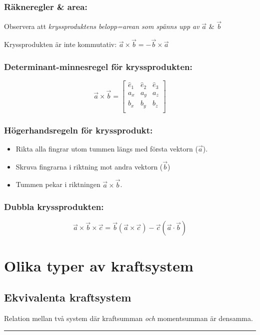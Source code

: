 \documentclass{article}
\newenvironment{ankiflashcard}[1][ ]{}{}
\newcommand{\ruler}{
\rule{0.5\textwidth}{0.5pt}
}
\begin{document}
\begin{paracol}{2}
\subsubsection{Räkneregler \& area:}
Observera att \textit{kryssproduktens belopp=arean som spänns upp av } $\vec a$ \& $\vec b$


Kryssprodukten är inte kommutativ: $\vec a \times \vec b = -\vec b \times \vec a$

\subsubsection{Determinant-minnesregel för kryssprodukten:}
$$
\vec a \times \vec b =
\begin{bmatrix}
\hat e_1&\hat e_2&\hat e_3\\
a_x&a_y&a_z\\
b_x&b_y&b_z\\
\end{bmatrix}
$$
\subsubsection{Högerhandsregeln för kryssprodukt:}
\begin{itemize}
    \item Rikta alla fingrar utom tummen längs med första vektorn ($\vec a$).
    \item  Skruva fingrarna i riktning mot andra vektorn ($\vec b$)
    \item Tummen pekar i riktningen $\vec a\times\vec b$.
    
\end{itemize}

\begin{ankiflashcard}
\subsubsection{Dubbla kryssprodukten:}
$$
\vec a \times \vec b \times \vec c =\vec b(\vec a \times \vec c)-\vec c(\vec a \cdot \vec b)
$$
\end{ankiflashcard}

\section{Olika typer av kraftsystem}

\begin{ankiflashcard}
\subsection{Ekvivalenta kraftsystem}
Relation mellan två system där kraftsumman \textit{och} momentsumman är densamma.
\ruler
\end{ankiflashcard}


\end{paracol}
\end{document}
